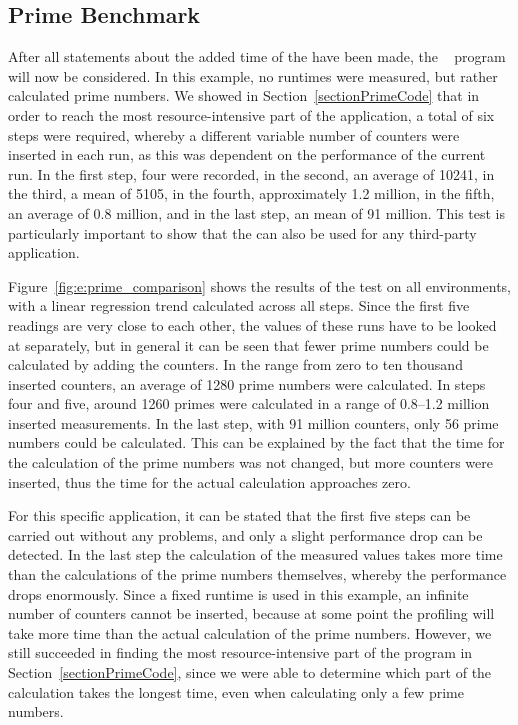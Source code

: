 \subsection{Prime Benchmark}
After all statements about the added time of the \TOOL have been made, the \PRIME~\cite{PrimeBenchmark} program will now be considered. In this example, no runtimes were measured, but rather calculated prime numbers. We showed in Section~\ref{sectionPrimeCode} that in order to reach the most resource-intensive part of the application, a total of six steps were required, whereby a different variable number of counters were inserted in each run, as this was dependent on the performance of the current run. In the first step, four \MEASUREVALUES were recorded, in the second, an average of 10241, in the third, a mean of 5105, in the fourth, approximately 1.2 million, in the fifth, an average of 0.8 million, and in the last step, an mean of 91 million. This test is particularly important to show that the \TOOL can also be used for any third-party application.

Figure~\ref{fig:e:prime_comparison} shows the results of the test on all environments, with a linear regression trend calculated across all steps. Since the first five readings are very close to each other, the values of these runs have to be looked at separately, but in general it can be seen that fewer prime numbers could be calculated by adding the counters. In the range from zero to ten thousand inserted counters, an average of 1280 prime numbers were calculated. In steps four and five, around 1260 primes were calculated in a range of 0.8--1.2 million inserted measurements. In the last step, with 91 million counters, only 56 prime numbers could be calculated. This can be explained by the fact that the time for the calculation of the prime numbers was not changed, but more counters were inserted, thus the time for the actual calculation approaches zero. 

For this specific application, it can be stated that the first five steps can be carried out without any problems, and only a slight performance drop can be detected. In the last step the calculation of the measured values takes more time than the calculations of the prime numbers themselves, whereby the performance drops enormously. Since a fixed runtime is used in this example, an infinite number of counters cannot be inserted, because at some point the profiling will take more time than the actual calculation of the prime numbers. However, we still succeeded in finding the most resource-intensive part of the program in Section~\ref{sectionPrimeCode}, since we were able to determine which part of the calculation takes the longest time, even when calculating only a few prime numbers. 